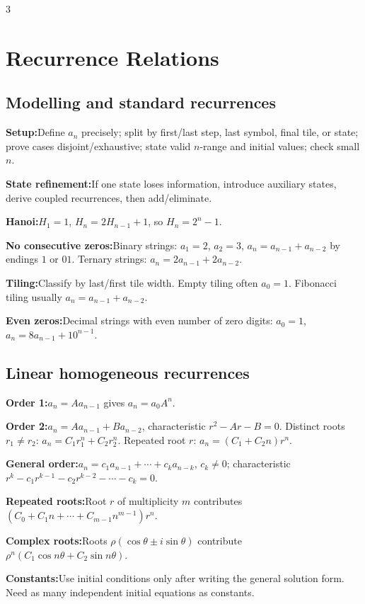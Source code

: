 \documentclass[10pt]{article}
\newenvironment{cheatitems}{\par\vspace{-1pt}}{\par\vspace{-1pt}}
\newcommand{\cheatrow}[2]{\par\noindent\textbf{#1:}\enspace #2\par}
\begin{document}
\begin{multicols}{3}
\section*{Recurrence Relations}
\subsection*{Modelling and standard recurrences}
\begin{cheatitems}
\cheatrow{Setup}{Define $a_n$ precisely; split by first/last step, last symbol, final tile, or state; prove cases disjoint/exhaustive; state valid $n$-range and initial values; check small $n$.}
\cheatrow{State refinement}{If one state loses information, introduce auxiliary states, derive coupled recurrences, then add/eliminate.}
\cheatrow{Hanoi}{$H_1=1$, $H_n=2H_{n-1}+1$, so $H_n=2^n-1$.}
\cheatrow{No consecutive zeros}{Binary strings: $a_1=2$, $a_2=3$, $a_n=a_{n-1}+a_{n-2}$ by endings $1$ or $01$. Ternary strings: $a_n=2a_{n-1}+2a_{n-2}$.}
\cheatrow{Tiling}{Classify by last/first tile width. Empty tiling often $a_0=1$. Fibonacci tiling usually $a_n=a_{n-1}+a_{n-2}$.}
\cheatrow{Even zeros}{Decimal strings with even number of zero digits: $a_0=1$, $a_n=8a_{n-1}+10^{n-1}$.}
\end{cheatitems}

\subsection*{Linear homogeneous recurrences}
\begin{cheatitems}
\cheatrow{Order 1}{$a_n=Aa_{n-1}$ gives $a_n=a_0A^n$.}
\cheatrow{Order 2}{$a_n=Aa_{n-1}+Ba_{n-2}$, characteristic $r^2-Ar-B=0$. Distinct roots $r_1\ne r_2$: $a_n=C_1r_1^n+C_2r_2^n$. Repeated root $r$: $a_n=(C_1+C_2n)r^n$.}
\cheatrow{General order}{$a_n=c_1a_{n-1}+\cdots+c_ka_{n-k}$, $c_k\ne0$; characteristic $r^k-c_1r^{k-1}-c_2r^{k-2}-\cdots-c_k=0$.}
\cheatrow{Repeated roots}{Root $r$ of multiplicity $m$ contributes $(C_0+C_1n+\cdots+C_{m-1}n^{m-1})r^n$.}
\cheatrow{Complex roots}{Roots $\rho(\cos\theta\pm i\sin\theta)$ contribute $\rho^n(C_1\cos n\theta+C_2\sin n\theta)$.}
\cheatrow{Constants}{Use initial conditions only after writing the general solution form. Need as many independent initial equations as constants.}
\end{cheatitems}


\end{multicols}
\end{document}
